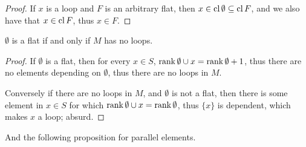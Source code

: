 \begin{proof}
    If $x$ is a loop and $F$ is an arbitrary flat, then  $x \in \operatorname{cl}{\emptyset} \subseteq \operatorname{cl}{F}$, 
    and we also have that $x \in \operatorname{cl}{F}$, thus $x \in F$.
\end{proof}
\begin{corollary}
    $\emptyset$ is a flat if and only if  $M$ has no loops.
\end{corollary}
\begin{proof}
    If $\emptyset$ is a flat, then for every  $x \in S$,  $\operatorname{rank}{\emptyset \cup
    x}=\operatorname{rank}{\emptyset}+1$, thus there are no elements depending on $\emptyset$, thus there are no
    loops in $M$.

    Conversely if there are no loops in  $M$, and  $\emptyset$ is not a flat, then there is some
    element in $x \in S$ for which  $\operatorname{rank}{\emptyset \cup x}=\operatorname{rank}{\emptyset}$, thus $\{x\}$ is
    dependent, which makes $x$ a loop; absurd.
\end{proof}

And the following proposition for parallel elements.

